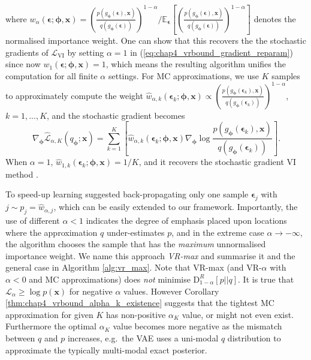 %
where $w_{\alpha}(\bm{\epsilon}; \bm{\phi}, \bm{x}) = \left( \frac{p(g_{\bm{\phi}}(\bm{\epsilon}), \bm{x})}{q(g_{\bm{\phi}}(\bm{\epsilon}))} \right)^{1 - \alpha} \bigg/ \mathbb{E}_{\bm{\epsilon}} \left[ \left( \frac{p(g_{\bm{\phi}}(\bm{\epsilon}), \bm{x})}{q(g_{\bm{\phi}}(\bm{\epsilon}))} \right)^{1 - \alpha} \right]$ denotes the normalised importance weight. 
%
One can show that this recovers the the stochastic gradients of $\mathcal{L}_{\text{VI}}$ by setting $\alpha = 1$ in (\ref{eq:chap4_vrbound_gradient_reparam}) since now $w_{1}(\bm{\epsilon}; \bm{\phi}, \bm{x}) = 1$, which means the resulting algorithm unifies the computation for all finite $\alpha$ settings. For MC approximations, we use $K$ samples to approximately compute the weight $\hat{w}_{\alpha, k}(\bm{\epsilon}_k; \bm{\phi}, \bm{x}) \propto \left( \frac{p(g_{\bm{\phi}}(\bm{\epsilon}_k), \bm{x})}{q(g_{\bm{\phi}}(\bm{\epsilon}_k))} \right)^{1 - \alpha}$, $k = 1, ..., K$, and the stochastic gradient becomes
\begin{equation}
\nabla_{\bm{\phi}} \hat{\mathcal{L}}_{\alpha, K}(q_{\bm{\phi}}; \bm{x}) 
= \sum_{k=1}^K \left[ \hat{w}_{\alpha, k}(\bm{\epsilon}_k; \bm{\phi}, \bm{x}) \nabla_{\bm{\phi}} \log \frac{p(g_{\bm{\phi}}(\bm{\epsilon}_k), \bm{x})}{q(g_{\bm{\phi}}(\bm{\epsilon}_k))} \right].
\end{equation}
When $\alpha = 1$, $\hat{w}_{1, k}(\bm{\epsilon}_k; \bm{\phi}, \bm{x}) = 1/K$, and it recovers the stochastic gradient VI method \citep{kingma:vae2014}.

To speed-up learning \citet{burda:iwae2016} suggested back-propagating only one sample $\bm{\epsilon}_j$ with $j \sim p_j = \hat{w}_{\alpha, j}$, which can be easily extended to our framework. Importantly, the use of different $\alpha < 1$ indicates the degree of emphasis placed upon locations where the approximation $q$ under-estimates $p$, and in the extreme case $\alpha \rightarrow -\infty$, the algorithm chooses the sample that has the \emph{maximum} unnormalised importance weight. 
%
We name this approach \emph{VR-max} and summarise it and the general case in Algorithm \ref{alg:vr_max}. 
%
Note that VR-max (and VR-$\alpha$ with $\alpha < 0$ and MC approximations) does \emph{not} minimise $\mathrm{D}_{1-\alpha}^{R}[p||q]$. It is true that $\mathcal{L}_{\alpha} \geq \log p(\bm{x})$ for negative $\alpha$ values. However Corollary \ref{thm:chap4_vrbound_alpha_k_existence} suggests that the tightest MC approximation for given $K$ has non-positive $\alpha_K$ value, or might not even exist. Furthermore the optimal $\alpha_K$ value becomes more negative as the mismatch between $q$ and $p$ increases, e.g.~the VAE uses a uni-modal $q$ distribution to approximate the typically multi-modal exact posterior.



